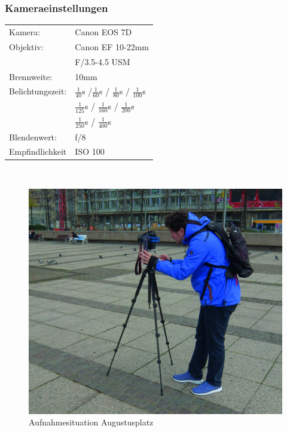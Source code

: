 \documentclass[liststotoc,bibtotoc,fontsize=14pt,]{scrreprt}
\begin{document}
		\subsubsection{Kameraeinstellungen}
		\begin{minipage}{0.58\textwidth}
			\begin{tabular}{ll}
				Kamera: &Canon EOS 7D \\
				Objektiv: &Canon EF 10-22mm \\
				& F/3.5-4.5 USM\\		
				Brennweite:& 10mm \\
				Belichtungszeit: &$\frac{1}{40}$s /$\frac{1}{60}$s / $\frac{1}{80}$s / $\frac{1}{100}$s \\
				 &$\frac{1}{125}$s / $\frac{1}{160}$s / $\frac{1}{200}$s \\
				 &$\frac{1}{250}$s / $\frac{1}{400}$s \\
				Blendenwert: & f/8\\
				Empfindlichkeit & ISO 100 \\
			\end{tabular}\\
		\end{minipage}%
		\begin{minipage}{0.42\textwidth}
			\begin{figure}[H]
				\includegraphics[width=\linewidth]{img/places/ap.jpg}
				\caption{Aufnahmesituation Augustusplatz}
				\label{img:ak}
			\end{figure}
		\end{minipage}%
		
\end{document}
